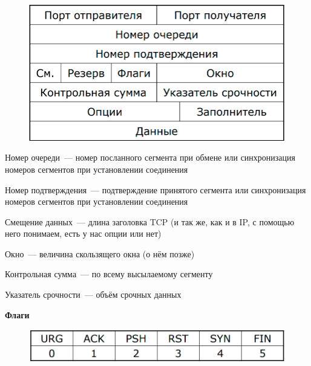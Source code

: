 \begin{figure}[H]
  \centering
  \includegraphics[width=15cm]{images/03/04}
\end{figure}

\begin{MyItemize}
    \item Номер очереди~--- номер посланного сегмента при обмене или синхронизация номеров сегментов при установлении соединения
    \item Номер подтверждения~--- подтверждение принятого сегмента или синхронизация номеров сегментов при установлении соединения
    \item Смещение данных~--- длина заголовка TCP (и так же, как и в IP, с помощью него понимаем, есть у нас опции или нет)
    \item Окно~--- величина скользящего окна (о нём позже)
    \item Контрольная сумма~--- по всему высылаемому сегменту
    \item Указатель срочности~--- объём срочных данных

\end{MyItemize}

{\bf Флаги}

\begin{figure}[H]
  \centering
  \includegraphics[width=15cm]{images/03/05}
\end{figure}

